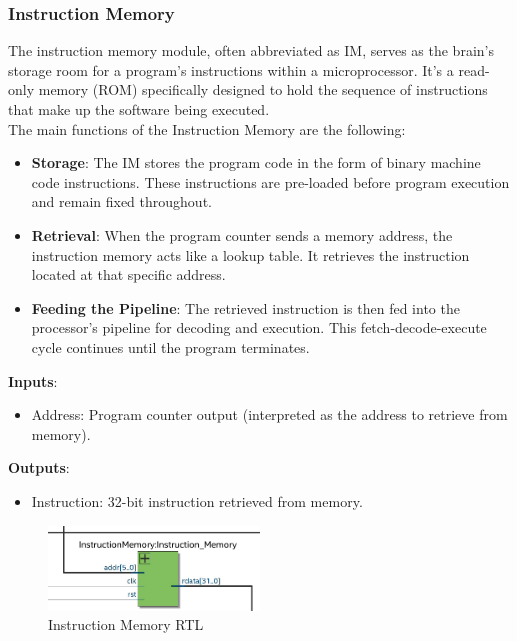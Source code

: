 \documentclass[9pt,a4paper,twoside]{tau}
\begin{document}
\subsubsection{Instruction Memory}
    The instruction memory module, often abbreviated as IM, serves as the brain's storage room for a program's instructions within a microprocessor. It's a read-only memory (ROM) specifically designed to hold the sequence of instructions that make up the software being executed. \\

    The main functions of the Instruction Memory are the following:

    \begin{itemize}
        \item \textbf{Storage}: The IM stores the program code in the form of binary machine code instructions. These instructions are pre-loaded before program execution and remain fixed throughout.
        \item \textbf{Retrieval}: When the program counter sends a memory address, the instruction memory acts like a lookup table. It retrieves the instruction located at that specific address.
        \item \textbf{Feeding the Pipeline}: The retrieved instruction is then fed into the processor's pipeline for decoding and execution. This fetch-decode-execute cycle continues until the program terminates.\\
    \end{itemize}

    \textbf{Inputs}:
    \begin{itemize}
        \item Address: Program counter output (interpreted as the address to retrieve from memory).

    \end{itemize}
    
    \textbf{Outputs}:
    \begin{itemize}
        \item Instruction: 32-bit instruction retrieved from memory.
    \end{itemize}


    \begin{figure}[h]  %
        \centering  %
        \includegraphics[width=0.5\textwidth]{images/InstMemImg.png}
        \caption{Instruction Memory RTL}
        \label{fig:Instruction Memory RTL}
    \end{figure}
    
\end{document}
